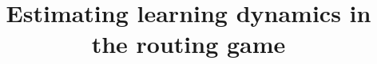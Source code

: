 \documentclass{sig-alternate-ipsn13}
\begin{document}
\title{Estimating learning dynamics in the routing game
}
%
%
%
%
%
\end{document}
